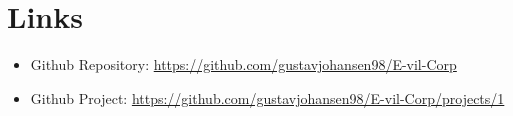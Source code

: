 

    \section{Links}
        \begin{itemize}
            \item Github Repository: \hyperlink{https://github.com/gustavjohansen98/E-vil-Corp}{https://github.com/gustavjohansen98/E-vil-Corp}
            \item Github Project: \hyperlink{https://github.com/gustavjohansen98/E-vil-Corp/projects/1}{https://github.com/gustavjohansen98/E-vil-Corp/projects/1}
        \end{itemize}
